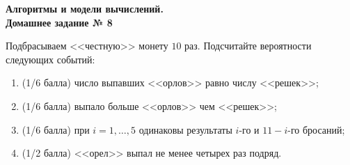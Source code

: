 \documentclass[a4paper,12pt]{article}
\begin{document}
	
	\thispagestyle{firstpage}
	
	\begin{center}
		\textbf{\Large{Алгоритмы и модели вычислений. \\ Домашнее задание № 8}}
	\end{center}
	
\begin{tasknum}{1}
Подбрасываем <<честную>> монету $10$ раз. Подсчитайте вероятности следующих событий:
\begin{enumerate}
\item (1/6 балла)  число выпавших <<орлов>>  равно числу <<решек>>;

\item (1/6 балла)  выпало больше <<орлов>>  чем <<решек>>;

\item (1/6 балла) при $i=1,\dots,5$ одинаковы результаты $i$-го и $11-i$-го бросаний;

\item (1/2 балла) <<орел>> выпал не менее четырех раз подряд.

\end{enumerate} 
\end{tasknum}
\end{document}
